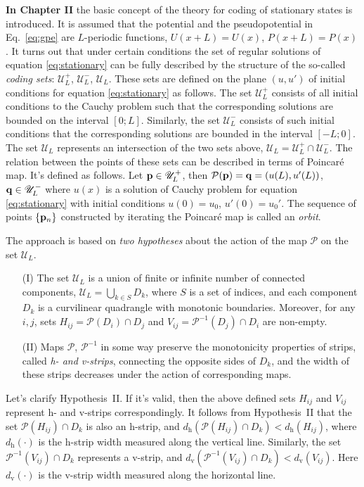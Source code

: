 \documentclass[candidate, href, colorlinks]{disser}
\begin{document}
\textbf{In Chapter II} the basic concept of the theory for coding of stationary states is introduced.
It is assumed that the potential and the pseudopotential in Eq.~\eqref{eq:gpe} are $L$-periodic functions, $U(x + L) = U(x)$, $P(x + L) = P(x)$.
It turns out that under certain conditions the set of regular solutions of equation \eqref{eq:stationary} can be fully described by the structure of the so-called {\it coding sets}: $\mathscr{U}_L^+$, $\mathscr{U}_L^-$, $\mathscr{U}_L$.
These sets are defined on the plane $(u, u')$ of initial conditions for equation \eqref{eq:stationary} as follows.
The set $\mathscr{U}_L^+$ consists of all initial conditions to the Cauchy problem such that the corresponding solutions are bounded on the interval $[0; L]$.
Similarly, the set $\mathscr{U}_L^-$ consists of such initial conditions that the corresponding solutions are bounded in the interval $[-L; 0]$.
The set $\mathscr{U}_L$ represents an intersection of the two sets above, $\mathscr{U}_L = \mathscr{U}_L^+ \cap \mathscr{U}_L^-$.
The relation between the points of these sets can be described in terms of Poincar\'e map.
It's defined as follows.
Let $\vb{p} \in \mathscr{U}_L^+$, then $\mathcal{P} (\vb{p}) = \vb{q} = (u(L), u'(L))$, $\vb{q} \in \mathscr{U}_L^-$ where $u(x)$ is a solution of Cauchy problem for equation \eqref{eq:stationary} with initial conditions $u(0) = u_0$, $u'(0) = u_0'$.
The sequence of points $\{ \vb{p}_n \}$ constructed by iterating the Poincar\'e map is called an {\it orbit}.

The approach is based on {\it two hypotheses} about the action of the map $\mathcal{P}$ on the set $\mathscr{U}_L$.
\begin{itemize}
	\item[(I)] The set $\mathscr{U}_L$ is a union of finite or infinite number of connected components, $\mathscr{U}_L = \bigcup_{k \in S} D_k$, where $S$ is a set of indices, and each component $D_k$ is a curvilinear quadrangle with monotonic boundaries.
		Moreover, for any $i, j$, sets $H_{ij} = \mathcal{P}(D_i) \cap D_j$ and $V_{ij} = \mathcal{P}^{-1}(D_j) \cap D_i$ are non-empty.
	\item[(II)] Maps $\mathcal{P}$, $\mathcal{P}^{-1}$ in some way preserve the monotonicity properties of strips, called {\it h- and v-strips}, connecting the opposite sides of $D_k$, and the width of these strips decreases under the action of corresponding maps. 
\end{itemize}
Let's clarify Hypothesis~II.
If it's valid, then the above defined sets $H_{ij}$ and $V_{ij}$ represent h- and v-strips correspondingly.
It follows from Hypothesis~II that the set $\mathcal{P}(H_{ij}) \cap D_k$ is also an h-strip, and $d_{\mathrm{h}}(\mathcal{P}(H_{ij}) \cap D_k) < d_{\mathrm{h}}(H_{ij})$, where $d_{\mathrm{h}}(\cdot)$ is the h-strip width measured along the vertical line.
Similarly, the set $\mathcal{P}^{-1}(V_{ij}) \cap D_k$ represents a v-strip, and $d_{\mathrm{v}}(\mathcal{P}^{-1}(V_{ij}) \cap D_k) < d_{\mathrm{v}}(V_{ij})$.
Here $d_{\mathrm{v}}(\cdot)$ is the v-strip width measured along the horizontal line.
\end{document}
